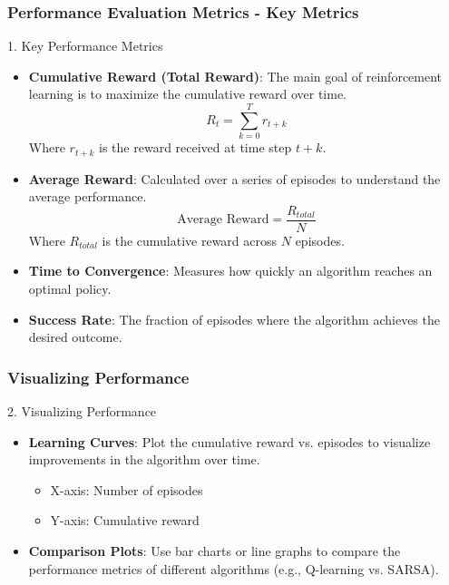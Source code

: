 \documentclass[aspectratio=169]{beamer}
\begin{document}
\begin{frame}[fragile]
    \frametitle{Performance Evaluation Metrics - Key Metrics}
    \begin{block}{1. Key Performance Metrics}
        \begin{itemize}
            \item \textbf{Cumulative Reward (Total Reward)}:
                The main goal of reinforcement learning is to maximize the cumulative reward over time.
                \begin{equation}
                R_t = \sum_{k=0}^{T} r_{t+k}
                \end{equation}
                Where \( r_{t+k} \) is the reward received at time step \( t+k \).

            \item \textbf{Average Reward}:
                Calculated over a series of episodes to understand the average performance.
                \begin{equation}
                \text{Average Reward} = \frac{R_{total}}{N}
                \end{equation}
                Where \( R_{total} \) is the cumulative reward across \( N \) episodes.

            \item \textbf{Time to Convergence}:
                Measures how quickly an algorithm reaches an optimal policy.
                
            \item \textbf{Success Rate}:
                The fraction of episodes where the algorithm achieves the desired outcome.
        \end{itemize}
    \end{block}
\end{frame}

\begin{frame}[fragile]
    \frametitle{Visualizing Performance}
    \begin{block}{2. Visualizing Performance}
        \begin{itemize}
            \item \textbf{Learning Curves}:
                Plot the cumulative reward vs. episodes to visualize improvements in the algorithm over time.
                \begin{itemize}
                    \item X-axis: Number of episodes
                    \item Y-axis: Cumulative reward
                \end{itemize}

            \item \textbf{Comparison Plots}:
                Use bar charts or line graphs to compare the performance metrics of different algorithms (e.g., Q-learning vs. SARSA).
        \end{itemize}
    \end{block}
\end{frame}
\end{document}
